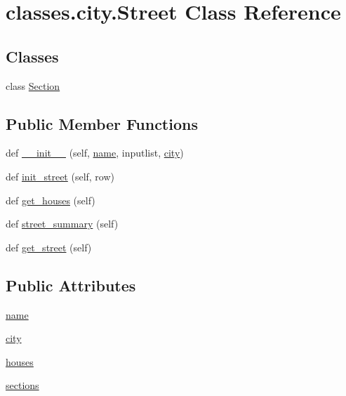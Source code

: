 \hypertarget{classclasses_1_1city_1_1Street}{}\section{classes.\+city.\+Street Class Reference}
\label{classclasses_1_1city_1_1Street}
\subsection*{Classes}
\begin{DoxyCompactItemize}
\item 
class \hyperlink{classclasses_1_1city_1_1Street_1_1Section}{Section}
\end{DoxyCompactItemize}
\subsection*{Public Member Functions}
\begin{DoxyCompactItemize}
\item 
def \hyperlink{classclasses_1_1city_1_1Street_a3d4a39c16569cf6a55fd52bd6af50853}{\+\_\+\+\_\+init\+\_\+\+\_\+} (self, \hyperlink{classclasses_1_1city_1_1Street_ac72e16858d67ae7150a8e6b075f32761}{name}, inputlist, \hyperlink{classclasses_1_1city_1_1Street_a11db149d0f12a7bd3bba7ef20d0d016d}{city})
\item 
def \hyperlink{classclasses_1_1city_1_1Street_ad3e92fed0eac4ff5e0c1453877ec0f21}{init\+\_\+street} (self, row)
\item 
def \hyperlink{classclasses_1_1city_1_1Street_a5c8395befdf14acb6adb9fe99b6a3bf6}{get\+\_\+houses} (self)
\item 
def \hyperlink{classclasses_1_1city_1_1Street_aa6253790aef413dfa98230d0a1a59955}{street\+\_\+summary} (self)
\item 
def \hyperlink{classclasses_1_1city_1_1Street_a4e35b37919d3ff59b692dd1fadeb1096}{get\+\_\+street} (self)
\end{DoxyCompactItemize}
\subsection*{Public Attributes}
\begin{DoxyCompactItemize}
\item 
\hyperlink{classclasses_1_1city_1_1Street_ac72e16858d67ae7150a8e6b075f32761}{name}
\item 
\hyperlink{classclasses_1_1city_1_1Street_a11db149d0f12a7bd3bba7ef20d0d016d}{city}
\item 
\hyperlink{classclasses_1_1city_1_1Street_a6d79dce4cfa97c18313004c0db651e9b}{houses}
\item 
\hyperlink{classclasses_1_1city_1_1Street_adb62512e18c7a4cd9b1525dadd6cb575}{sections}
\end{DoxyCompactItemize}


